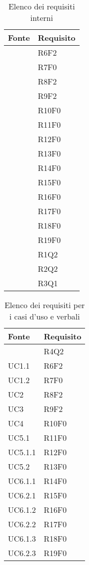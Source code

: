 		\begin{table}[H]
			\centering
			\begin{tabularx}{\textwidth}{YY}
				\textbf{Fonte} & \textbf{Requisito} \\
				\toprule
				 & R6F2 \\
				 & R7F0 \\
				 & R8F2 \\
				 & R9F2 \\
				 & R10F0 \\
				 & R11F0 \\
				 & R12F0 \\
				 & R13F0 \\
				 & R14F0 \\
				 & R15F0 \\
				 & R16F0 \\
				 & R17F0 \\
				 & R18F0 \\
				 & R19F0 \\
				 & R1Q2 \\
				 & R2Q2 \\
				  & R3Q1 \\
				\bottomrule
			\end{tabularx}
		\caption{Elenco dei requisiti interni}
	\end{table}

		\begin{table}[H]
			\centering
			\begin{tabularx}{\textwidth}{YY}
				\textbf{Fonte} & \textbf{Requisito} \\				
				\toprule
				 & R4Q2 \\
				UC1.1 & R6F2 \\
				UC1.2 & R7F0 \\
				UC2 & R8F2 \\
				UC3 & R9F2 \\
				UC4 & R10F0 \\
				UC5.1 & R11F0 \\
				UC5.1.1 & R12F0 \\
				UC5.2 & R13F0 \\
				UC6.1.1 & R14F0 \\
				UC6.2.1 & R15F0 \\
				UC6.1.2 & R16F0 \\
				UC6.2.2 & R17F0 \\
				UC6.1.3 & R18F0 \\
				UC6.2.3 & R19F0 \\
				\bottomrule
			\end{tabularx}
			\caption{Elenco dei requisiti per i casi d'uso e verbali}
		\end{table}
		
